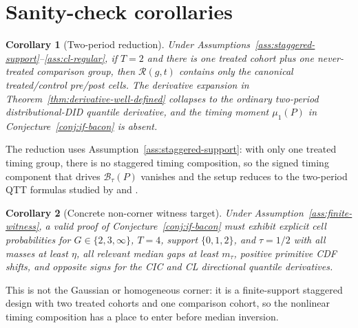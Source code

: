 \documentclass[11pt]{article}
\theoremstyle{definition}
\theoremstyle{plain}
\newtheorem{corollary}{Corollary}
\theoremstyle{remark}
\begin{document}
\section{Sanity-check corollaries}
\begin{corollary}[Two-period reduction]\label{cor:twoperiod}
Under Assumptions~\ref{ass:staggered-support}--\ref{ass:cl-regular}, if \(T=2\) and there is one treated cohort plus one never-treated comparison group, then \(\mathcal R(g,t)\) contains only the canonical treated/control pre/post cells.  The derivative expansion in Theorem~\ref{thm:derivative-well-defined} collapses to the ordinary two-period distributional-DID quantile derivative, and the timing moment \(\mu_1(P)\) in Conjecture~\ref{conj:if-bacon} is absent.
\end{corollary}
The reduction uses Assumption~\ref{ass:staggered-support}: with only one treated timing group, there is no staggered timing composition, so the signed timing component that drives \(\mathcal B_\tau(P)\) vanishes and the setup reduces to the two-period QTT formulas studied by \citet{CallawayLiOka2018} and \citet{CallawayLi2019}.

\begin{corollary}[Concrete non-corner witness target]\label{cor:witness}
Under Assumption~\ref{ass:finite-witness}, a valid proof of Conjecture~\ref{conj:if-bacon} must exhibit explicit cell probabilities for \(G\in\{2,3,\infty\}\), \(T=4\), support \(\{0,1,2\}\), and \(\tau=1/2\) with all masses at least \(\eta\), all relevant median gaps at least \(m_\tau\), positive primitive CDF shifts, and opposite signs for the CIC and CL directional quantile derivatives.
\end{corollary}
This is not the Gaussian or homogeneous corner: it is a finite-support staggered design with two treated cohorts and one comparison cohort, so the nonlinear timing composition has a place to enter before median inversion.
\end{document}
